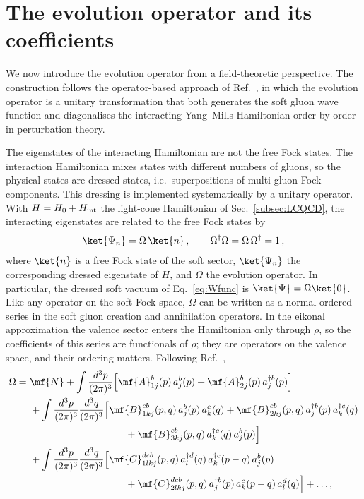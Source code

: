 \section{The evolution operator and its coefficients}\label{sec:omega}
We now introduce the evolution operator from a field-theoretic perspective. The construction follows
the operator-based approach of Ref.~\cite{Kovner:2018rbf}, in which the evolution operator is a
unitary transformation that both generates the soft gluon wave function and diagonalises the
interacting Yang--Mills Hamiltonian order by order in perturbation theory.

The eigenstates of the interacting Hamiltonian are not the free Fock states. The interaction
Hamiltonian mixes states with different numbers of gluons, so the physical states are dressed states,
i.e.\ superpositions of multi-gluon Fock components. This dressing is implemented systematically by
a unitary operator. With $H=H_{0}+H_{\rm int}$ the light-cone Hamiltonian of Sec.~\ref{subsec:LCQCD},
the interacting eigenstates are related to the free Fock states by
\begin{align}\label{eq:dressing}
\ket{\Psi_{n}}=\Omega\,\ket{n}\,,\qquad \Omega^{\dagger}\Omega=\Omega\,\Omega^{\dagger}=1\,,
\end{align}
where $\ket{n}$ is a free Fock state of the soft sector, $\ket{\Psi_{n}}$ the corresponding dressed
eigenstate of $H$, and $\Omega$ the evolution operator. In particular, the dressed soft vacuum of
Eq.~\eqref{eq:Wfunc} is $\ket{\Psi}=\Omega\ket{0}$. Like any operator on the soft Fock space, $\Omega$ can
be written as a normal-ordered series in the soft gluon creation and annihilation operators. In the
eikonal approximation the valence sector enters the Hamiltonian only through $\rho$, so the
coefficients of this series are functionals of $\rho$; they are operators on the valence space, and
their ordering matters. Following Ref.~\cite{Radhakrishnan:2026bxy},
\begin{align}\label{eq:OmegaExp}
\Omega=\ &\mf{N}
+\int\frac{d^3p}{(2\pi)^3}\Big[\mf{A}^b_{1j}(p)\,a^b_j(p)+\mf{A}^b_{2j}(p)\,a^{\dagger b}_j(p)\Big]
\notag\\
&+\int\frac{d^3p}{(2\pi)^3}\frac{d^3q}{(2\pi)^3}\Big[\mf{B}^{cb}_{1kj}(p,q)\,a^b_j(p)\,a^c_k(q)
+\mf{B}^{cb}_{2kj}(p,q)\,a^{\dagger b}_j(p)\,a^{\dagger c}_k(q)
\notag\\
&\hspace{3.4cm}+\mf{B}^{cb}_{3kj}(p,q)\,a^{\dagger c}_k(q)\,a^b_j(p)\Big]
\notag\\
&+\int\frac{d^3p}{(2\pi)^3}\frac{d^3q}{(2\pi)^3}\Big[\mf{C}^{dcb}_{1lkj}(p,q)\,a^{\dagger d}_l(q)\,a^{\dagger c}_k(p-q)\,a^b_j(p)
\notag\\
&\hspace{3.4cm}+\mf{C}^{dcb}_{2lkj}(p,q)\,a^{\dagger b}_j(p)\,a^c_k(p-q)\,a^d_l(q)\Big]+\dots,
\end{align}
